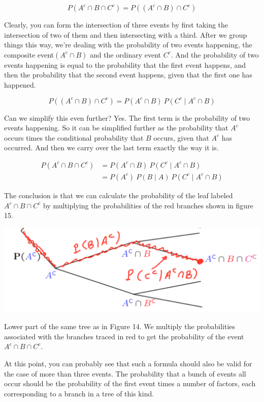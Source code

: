 \documentclass{tufte-handout}
\begin{document}
$$
P(A^c \cap B \cap C^c) = P\left( (A^c \cap B) \cap C^c \right)
$$


Clearly, you can form the intersection of three events by first taking the intersection of two of them and
then intersecting with a third. After we group things this way, we're dealing with the probability of two
events happening, the composite event$(A^c \cap B)$ and the ordinary event $C^c$. And the probability of two events
happening is equal to the probability that the first event happens, and then the probability that the
second event happens, given that the first one has happened.

$$
P\left( (A^c \cap B) \cap C^c \right) = P (A^c \cap B) \  P(C^c \mid A^c \cap B)
$$


Can we simplify this even further? Yes. The first term is the probability of two events happening. So it
can be simplified further as the probability that $A^c$ occurs times the conditional probability
that $B$ occurs, given that $A^c$ has occurred. And then we carry over the last term exactly the
way it is.

\begin{align*}
P( A^c \cap B \cap C^c ) &= P (A^c \cap B) \  P(C^c \mid A^c \cap B) \\
&= P(A^c) \ P(B \mid A) \ P(C^c \mid A^c \cap B) 
\end{align*}


The conclusion is that we can calculate the probability of the leaf labeled $A^c \cap B \cap C^c$ by multiplying 
the probabilities of the red branches shown in figure 15.
\begin{marginfigure}
  \includegraphics{LowerHalfTree}
  \caption{Lower part of the same tree as in Figure 14. We multiply the probabilities associated with the branches traced in red to get the probability of the event $A^c \cap B \cap C^c$.}
\end{marginfigure}

\vspace{0.2cm}
At this point, you can probably see that such a formula should also be valid for the case of
more than three events. The probability that a bunch of events all occur should be the probability of the
first event times a number of factors, each corresponding to a branch in a tree of this kind.
\end{document}
